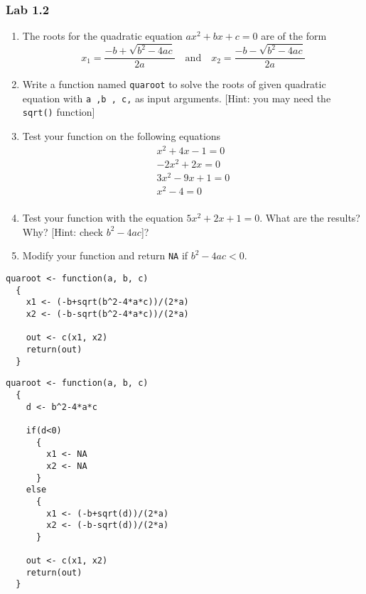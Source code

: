 \documentclass[10pt]{beamer}
\begin{document}
\begin{frame}
\frametitle{Lab 1.2}

\begin{enumerate}
\item The roots for the quadratic equation $ax^2+bx+c=0$ are of the form
      \begin{equation*}
        \label{eq:1}
        x_1=\frac{-b + \sqrt {b^2-4ac}}{2a} \quad \text{and} \quad
        x_2=\frac{-b - \sqrt {b^2-4ac}}{2a}
      \end{equation*}
\item Write a function named \texttt{quaroot} to solve the roots of given
  quadratic equation with \texttt{a ,b , c,} as input
  arguments. [Hint: you may need the \texttt{sqrt()} function]
\item Test your function on the following equations
  \begin{equation*}
    \label{eq:2}
    \begin{split}
      x^2+4x-1=0\\
      -2x^2+2x=0\\
      3x^2-9x+1=0\\
      x^2 -4 = 0\\
    \end{split}
  \end{equation*}
\item Test your function with the equation $5x^2+2x+1=0$. What are the results? Why? [Hint: check $b^2-4ac$]?
\item Modify your function and return \texttt{NA} if $b^2-4ac < 0$.
\end{enumerate}


\end{frame}


\begin{frame}[fragile]
\begin{verbatim}
quaroot <- function(a, b, c)
  {
    x1 <- (-b+sqrt(b^2-4*a*c))/(2*a)
    x2 <- (-b-sqrt(b^2-4*a*c))/(2*a)

    out <- c(x1, x2)
    return(out)
  }
\end{verbatim}
\end{frame}

\begin{frame}[fragile]
\begin{verbatim}
quaroot <- function(a, b, c)
  {
    d <- b^2-4*a*c

    if(d<0)
      {
        x1 <- NA
        x2 <- NA
      }
    else
      {
        x1 <- (-b+sqrt(d))/(2*a)
        x2 <- (-b-sqrt(d))/(2*a)
      }

    out <- c(x1, x2)
    return(out)
  }
\end{verbatim}
\end{frame}
\end{document}
